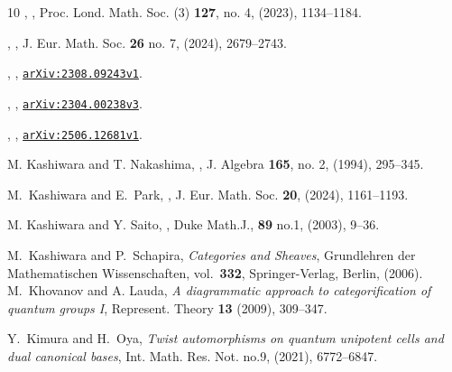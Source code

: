 \documentclass[12pt,leqno]{amsart}%
\newcommand{\arxiv}[1]{\href{http://arxiv.org/abs/#1}{\texttt{arXiv:#1}}}
\theoremstyle{plain}
\theoremstyle{definition}
\numberwithin{equation}{section}
\begin{document}
\begin{thebibliography}{10}
\bysame, 
 , 
 Proc. Lond. Math. Soc. (3) \textbf{127}, no. 4,  (2023), 1134--1184. 

  \bysame,
 , 
J. Eur. Math. Soc. {\bf 26} no. 7, (2024), 2679--2743. 

\bysame, , \arxiv{2308.09243v1}.

\bysame, ,
\arxiv{2304.00238v3}.

  \bysame, ,
  \arxiv{2506.12681v1}.
  
  M. Kashiwara and T. Nakashima,
, 
       J. Algebra {\bf 165}, no. 2, (1994), 295--345.
       


 

           
M.~Kashiwara and E.~Park, ,
J. Eur. Math. Soc. \textbf{20}, (2024), 1161--1193.

 M. Kashiwara and Y. Saito,
, 
Duke Math.J., {\bf 89} no.1, (2003), 9--36.

 M.~Kashiwara and P.~Schapira,
\emph{Categories and Sheaves},
Grundlehren der Mathematischen Wissenschaften, vol.~\textbf{332}, Springer-Verlag, Berlin, (2006).
%
M.~Khovanov and A. Lauda, \emph{A diagrammatic approach to
categorification of quantum groups
  {I}}, Represent. Theory \textbf{13} (2009), 309--347.


Y.~Kimura and H.~Oya, \emph{Twist automorphisms on quantum unipotent cells and dual canonical bases}, Int. Math. Res. Not. no.9,  (2021), 6772--6847.


\end{thebibliography}
\end{document}
